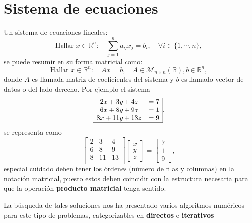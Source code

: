 \documentclass[11pt]{article}
\begin{document}


\section{Sistema de ecuaciones}

Un sistema de ecuaciones lineales:
$$
\text{Hallar } x\in \mathbb{R}^n:\quad  \sum_{j=1}^{n} a_{ij}x_j=b_i ,\quad \forall i\in\{1,\cdots,n\} ,
$$
se puede resumir en su forma matricial como:
$$
\text{Hallar } x\in \mathbb{R}^n:\quad  A x = b ,\quad  A\in \mathcal{M}_{n\times n }(\mathbb{R}), b\in \mathbb{R}^n,
$$
donde $A$ es llamada matriz de coeficientes del sistema y $b$ es llamado vector de datos o del lado derecho. Por ejemplo el sistema
$$
\begin{array}{cc|}
2x+3y+4z & =7\\
6x+8y+9z & =1 \\
8x+11y+13z &=9\\ 
\hline
\end{array},
$$
se representa como
$$
\begin{bmatrix}
2 & 3& 4 \\
6 & 8& 9 \\
8& 11 & 13 \\
\end{bmatrix}
\begin{bmatrix}
x \\ y\\ z
\end{bmatrix}
= 
\begin{bmatrix}
7\\1\\9
\end{bmatrix},
$$
especial cuidado deben tener los \'ordenes (n\'umero de filas y columnas) en la notaci\'on matricial, puesto estos deben coincidir con la estructura necesaria para que la operaci\'on \textbf{producto matricial} tenga sentido.

La b\'usqueda de tales soluciones nos ha presentado varios algoritmos num\'ericos para este tipo de problemas, categorizables en \textbf{directos} e \textbf{iterativos}
\end{document}
